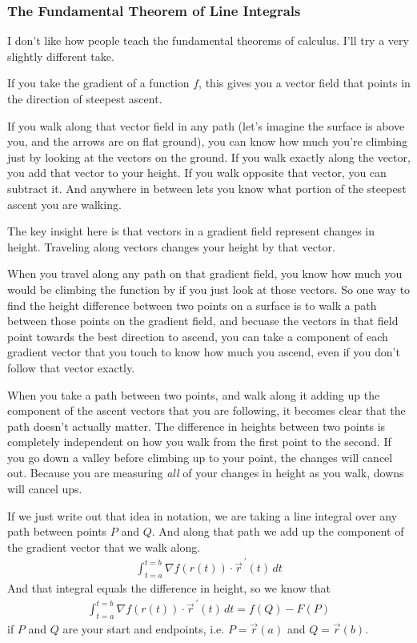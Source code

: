 \documentclass[12pt, letterpaper]{article}
\begin{document}
\subsubsection{The Fundamental Theorem of Line Integrals}
I don't like how people teach the fundamental theorems of calculus.
I'll try a very slightly different take.

If you take the gradient of a function $f$, this gives you a vector field that points in the direction of steepest ascent.

If you walk along that vector field in any path (let's imagine the surface is above you, and the arrows are on flat ground), you can know how much you're climbing just by looking at the vectors on the ground.
If you walk exactly along the vector, you add that vector to your height.
If you walk opposite that vector, you can subtract it.
And anywhere in between lets you know what portion of the steepest ascent you are walking.

The key insight here is that vectors in a gradient field represent changes in height.
Traveling along vectors changes your height by that vector.

When you travel along any path on that gradient field, you know how much you would be climbing the function by if you just look at those vectors.
So one way to find the height difference between two points on a surface is to walk a path between those points on the gradient field,
and becuase the vectors in that field point towards the best direction to ascend, you can take a component of each gradient vector that you touch to know how much you ascend,
even if you don't follow that vector exactly.

When you take a path between two points, and walk along it adding up the component of the ascent vectors that you are following, it becomes clear that the path doesn't actually matter.
The difference in heights between two points is completely independent on how you walk from the first point to the second.
If you go down a valley before climbing up to your point, the changes will cancel out.
Because you are measuring \emph{all} of your changes in height as you walk, downs will cancel ups.

If we just write out that idea in notation, we are taking a line integral over any path between points $P$ and $Q$.
And along that path we add up the component of the gradient vector that we walk along.
\begin{gather*}
    \int_{t=a}^{t=b} \nabla f(r(t)) \cdot \vec{r}^{\,\prime} (t) \, dt
\end{gather*}
And that integral equals the difference in height, so we know that 
\begin{gather*}
    \int_{t=a}^{t=b} \nabla f(r(t)) \cdot \vec{r}^{\,\prime} (t) \, dt = f(Q) - F(P)
\end{gather*}
if $P$ and $Q$ are your start and endpoints, i.e. $P = \vec{r}(a)$ and $Q = \vec{r}(b)$.
\end{document}
